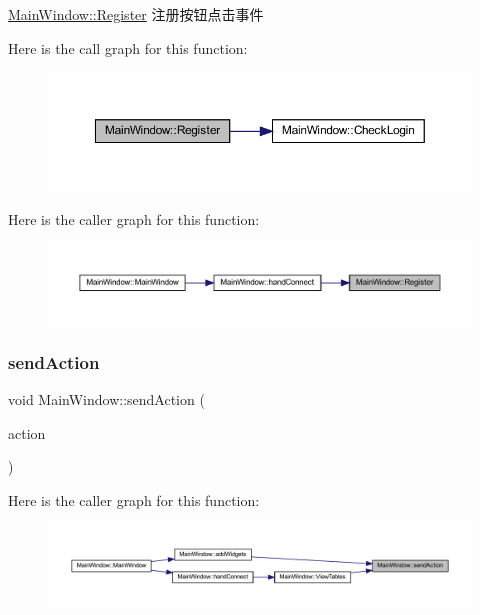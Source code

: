 \mbox{\hyperlink{class_main_window_a6228fbb5ed376fb71633b797affc2e11}{Main\+Window\+::\+Register}} 注册按钮点击事件 

Here is the call graph for this function\+:
\nopagebreak
\begin{figure}[H]
\begin{center}
\leavevmode
\includegraphics[width=350pt]{class_main_window_a6228fbb5ed376fb71633b797affc2e11_cgraph}
\end{center}
\end{figure}
Here is the caller graph for this function\+:
\nopagebreak
\begin{figure}[H]
\begin{center}
\leavevmode
\includegraphics[width=350pt]{class_main_window_a6228fbb5ed376fb71633b797affc2e11_icgraph}
\end{center}
\end{figure}
\mbox{\label{class_main_window_a8d4383f0927af91b372168fe024b4278}} 
\subsubsection{\texorpdfstring{sendAction}{sendAction}}
{\footnotesize\ttfamily void Main\+Window\+::send\+Action (\begin{DoxyParamCaption}\item[{Q\+Action $\ast$}]{action }\end{DoxyParamCaption})\hspace{0.3cm}{\ttfamily [signal]}}

Here is the caller graph for this function\+:
\nopagebreak
\begin{figure}[H]
\begin{center}
\leavevmode
\includegraphics[width=350pt]{class_main_window_a8d4383f0927af91b372168fe024b4278_icgraph}
\end{center}
\end{figure}
\mbox{\label{class_main_window_acd99802d86721ec111aa989a80b96ae3}} 
